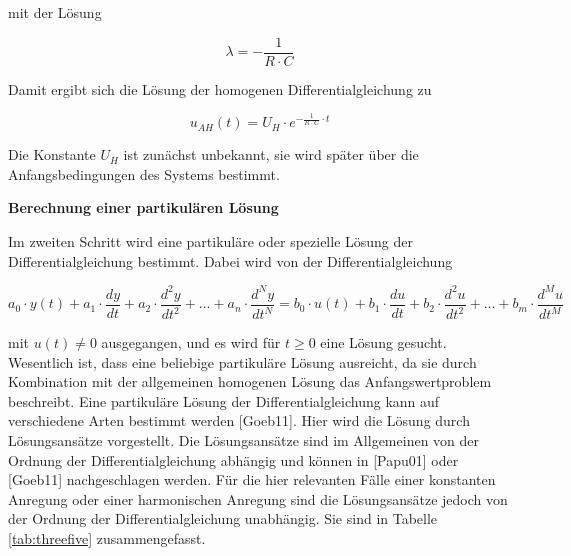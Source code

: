 \noindent mit der Lösung 

\begin{equation}\label{eq:seventyone}
\lambda=-\frac{1}{R\cdot C}
\end{equation}

\noindent Damit ergibt sich die Lösung der homogenen Differentialgleichung zu

\begin{equation}\label{eq:seventytwo}
u_{AH}(t) = U_{H} \cdot e^{-\frac{1}{R\cdot C}\cdot t}
\end{equation}

\noindent Die Konstante $U_{H}$ ist zunächst unbekannt, sie wird später über die Anfangsbedingungen des Systems bestimmt.\medskip

{\selectfont
\noindent\textbf{Berechnung einer partikulären Lösung}} \smallskip

\noindent Im zweiten Schritt wird eine partikuläre oder spezielle Lösung der Differentialgleichung bestimmt. Dabei wird von der Differentialgleichung

\begin{equation}\label{eq:seventythree}
a_{0}\cdot y(t) + a_{1}\cdot \frac{dy}{dt}+a_{2}\cdot \frac{d^2y}{dt^2}+ ... +a_{n}\cdot \frac{d^Ny}{dt^N}=
b_{0}\cdot u(t) + b_{1}\cdot \frac{du}{dt}+b_{2}\cdot \frac{d^2u}{dt^2}+ ... +b_{m}\cdot \frac{d^Mu}{dt^M}
\end{equation}

\noindent mit $u(t) \neq 0$ ausgegangen, und es wird für $t\geqslant  0$ eine Lösung gesucht. Wesentlich ist, dass eine beliebige partikuläre Lösung ausreicht, da sie durch Kombination mit der allgemeinen homogenen Lösung das Anfangswertproblem beschreibt.
Eine partikuläre Lösung der Differentialgleichung kann auf verschiedene Arten bestimmt werden [Goeb11]. Hier wird die Lösung durch Lösungsansätze vorgestellt. Die Lösungsansätze sind im Allgemeinen von der Ordnung der Differentialgleichung abhängig und können in [Papu01] oder [Goeb11] nachgeschlagen werden. Für die hier relevanten Fälle einer konstanten Anregung oder einer harmonischen Anregung sind die Lösungsansätze jedoch von der Ordnung der Differentialgleichung unabhängig. Sie sind in Tabelle \ref{tab:threefive} zusammengefasst.

